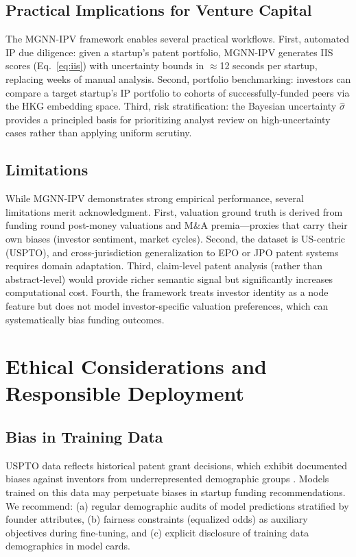 \documentclass[journal]{IEEEtran}
\begin{document}
\subsection{Practical Implications for Venture Capital}

The MGNN-IPV framework enables several practical workflows. First, automated IP due diligence: given a startup's patent portfolio, MGNN-IPV generates IIS scores (Eq.~\ref{eq:iis}) with uncertainty bounds in $\approx$12 seconds per startup, replacing weeks of manual analysis. Second, portfolio benchmarking: investors can compare a target startup's IP portfolio to cohorts of successfully-funded peers via the HKG embedding space. Third, risk stratification: the Bayesian uncertainty $\hat{\sigma}$ provides a principled basis for prioritizing analyst review on high-uncertainty cases rather than applying uniform scrutiny.

\subsection{Limitations}

While MGNN-IPV demonstrates strong empirical performance, several limitations merit acknowledgment. First, valuation ground truth is derived from funding round post-money valuations and M\&A premia—proxies that carry their own biases (investor sentiment, market cycles). Second, the dataset is US-centric (USPTO), and cross-jurisdiction generalization to EPO or JPO patent systems requires domain adaptation. Third, claim-level patent analysis (rather than abstract-level) would provide richer semantic signal but significantly increases computational cost. Fourth, the framework treats investor identity as a node feature but does not model investor-specific valuation preferences, which can systematically bias funding outcomes.

\section{Ethical Considerations and Responsible Deployment}

\subsection{Bias in Training Data}

USPTO data reflects historical patent grant decisions, which exhibit documented biases against inventors from underrepresented demographic groups \cite{bell2019lost}. Models trained on this data may perpetuate biases in startup funding recommendations. We recommend: (a) regular demographic audits of model predictions stratified by founder attributes, (b) fairness constraints (equalized odds) as auxiliary objectives during fine-tuning, and (c) explicit disclosure of training data demographics in model cards.
\end{document}
